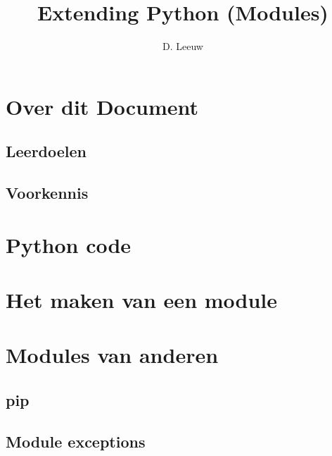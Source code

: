 \documentclass[a4paper,12pt,twoside,openright,titlepage]{article}
\author{D. Leeuw}
\title{Extending Python (Modules)}
\date{\today\\
1.1.0\\
\vfill
\raggedright
\copyright\ 2025-2026 Dennis Leeuw\\
}
\begin{document}

\maketitle


\section{Over dit Document}
\subsection{Leerdoelen}

\subsection{Voorkennis}




\section{Python code}


\section{Het maken van een module}


\section{Modules van anderen}

\subsection{pip}

\subsection{Module exceptions}


\printindex
\end{document}
